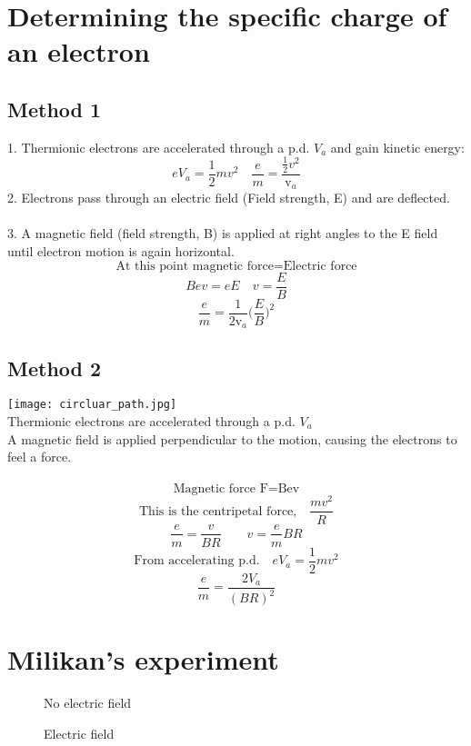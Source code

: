 \documentclass[12pt]{article}
\begin{document}
\section{Determining the specific charge of an electron}
\subsection{Method 1}
1. Thermionic electrons are accelerated through a p.d. $V_a$ and gain kinetic energy:\\
$$eV_a=\frac{1}{2}mv^2 \quad \frac{e}{m}=\frac{\frac{1}{2}v^2}{\textrm{v}_a}$$
2. Electrons pass through an electric field (Field strength, E) and are deflected.\\
\\
3. A magnetic field (field strength, B) is applied at right angles to the E field until electron motion is again horizontal.
$$\textrm{At this point magnetic force=Electric force}$$
$$Bev=eE \quad v=\frac{E}{B}$$
$$\frac{e}{m}=\frac{1}{2\textrm{v}_a}\Bigg(\frac{E}{B}\Bigg)^2$$
\subsection{Method 2}
\texttt{[image: circluar\_path.jpg]}\\
Thermionic electrons are accelerated through a p.d. $V_a$\\
A magnetic field is applied perpendicular to the motion, causing the electrons to feel a force.\\
\\
$$\textrm{Magnetic force   F=Bev}$$
$$\textrm{This is the centripetal force,} \quad \frac{mv^2}{R}$$
$$\frac{e}{m}=\frac{v}{BR} \quad \quad v=\frac{e}{m}BR$$
$$\textrm{From accelerating p.d.}\quad eV_a=\frac{1}{2}mv^2$$
$$\frac{e}{m}=\frac{2V_a}{(BR)^2}$$
\newpage
\section{Milikan's experiment}
\begin{figure}[h]
    \centering
    \begin{minipage}{0.45\textwidth}
        \centering
{}
        \caption{No electric field}
    \end{minipage}\hfill
    \begin{minipage}{0.45\textwidth}
        \centering
{}    
        \caption{Electric field}
    \end{minipage}
\end{figure}
\end{document}
